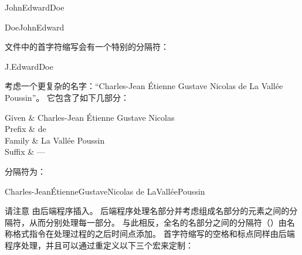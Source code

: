 \begin{namesample}
\item JohnEdwardDoe
\item DoeJohnEdward
\end{namesample}
%
 文件中的首字符缩写会有一个特别的分隔符：

\begin{namesample}
\item J.EdwardDoe
\end{namesample}
%
考虑一个更复杂的名字：\enquote{Charles-Jean Étienne Gustave Nicolas de La Vallée Poussin}。
它包含了如下几部分：

\begin{nameparts}
Given	& Charles-Jean Étienne Gustave Nicolas \\
Prefix	& de \\
Family	& La Vallée Poussin \\
Suffix	& --- \\
\end{nameparts}
%
分隔符为：

\begin{namesample}
\item Charles-JeanÉtienneGustaveNicolas%
      de%
      LaValléePoussin
\end{namesample}
%
请注意  由后端程序插入。
后端程序处理名部分并考虑组成名部分的元素之间的分隔符，从而分别处理每一部分。
与此相反，全名的名部分之间的分隔符（）由名称格式指令在处理过程的之后时间点添加。
首字符缩写的空格和标点同样由后端程序处理，并且可以通过重定义以下三个宏来定制：


